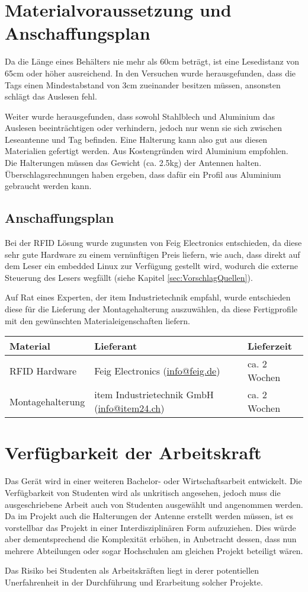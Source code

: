 \chapter{Materialvoraussetzung und Anschaffungsplan}
\label{sec:Materialvoraussetzung_Anschaffungsplan}
Da die Länge eines Behälters nie mehr als 60cm beträgt, ist eine Lesedistanz von 65cm oder höher ausreichend. In den Versuchen wurde herausgefunden, dass die Tags einen Mindestabstand von 3cm zueinander besitzen müssen, ansonsten schlägt das Auslesen fehl.

Weiter wurde herausgefunden, dass sowohl Stahlblech und Aluminium das Auslesen beeinträchtigen oder verhindern, jedoch nur wenn sie sich zwischen Leseantenne und Tag befinden. Eine Halterung kann also gut aus diesen Materialien gefertigt werden. Aus Kostengründen wird Aluminium empfohlen. Die Halterungen müssen das Gewicht (ca. 2.5kg) der Antennen halten. Überschlagsrechnungen haben ergeben, dass dafür ein Profil aus Aluminium gebraucht werden kann.

\section{Anschaffungsplan}
Bei der RFID Lösung wurde zugunsten von Feig Electronics entschieden, da diese sehr gute Hardware zu einem vernünftigen Preis liefern, wie auch, dass direkt auf dem Leser ein embedded Linux zur Verfügung gestellt wird, wodurch die externe Steuerung des Lesers wegfällt (siehe Kapitel \ref{sec:VorschlagQuellen}).

Auf Rat eines Experten, der item Industrietechnik empfahl, wurde entschieden diese für die Lieferung der Montagehalterung auszuwählen, da diese Fertigprofile mit den gewünschten Materialeigenschaften liefern.

\begin{table}[h!]
	\centering
	\begin{tabularx}{\textwidth}{|l|X|l|}
		\hline
		\textbf{Material} & \textbf{Lieferant} & \textbf{Lieferzeit} \\
		\hline
		RFID Hardware & Feig Electronics (\href{mailto:info@feig.de}{info@feig.de}) & ca. 2 Wochen\\
		\hline
		Montagehalterung & item Industrietechnik GmbH (\href{mailto:info@item24.ch}{info@item24.ch}) & ca. 2 Wochen\\
		\hline
	\end{tabularx}
\end{table}

\chapter{Verfügbarkeit der Arbeitskraft}
Das Gerät wird in einer weiteren Bachelor- oder Wirtschaftsarbeit entwickelt. Die Verfügbarkeit von Studenten wird als unkritisch angesehen, jedoch muss die ausgeschriebene Arbeit auch von Studenten ausgewählt und angenommen werden. Da im Projekt auch die Halterungen der Antenne erstellt werden müssen, ist es vorstellbar das Projekt in einer Interdisziplinären Form aufzuziehen. Dies würde aber dementsprechend die Komplexität erhöhen, in Anbetracht dessen, dass nun mehrere Abteilungen oder sogar Hochschulen am gleichen Projekt beteiligt wären.

Das Risiko bei Studenten als Arbeitskräften liegt in derer potentiellen Unerfahrenheit in der Durchführung und Erarbeitung solcher Projekte.
